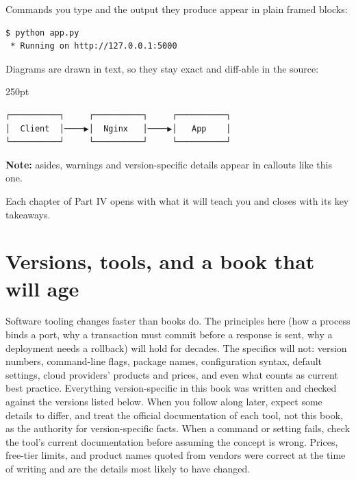 Commands you type and the output they produce appear in plain framed blocks:

\begin{outputbox}
\begin{Verbatim}[fontsize=\codesize]
$ python app.py
 * Running on http://127.0.0.1:5000
\end{Verbatim}
\end{outputbox}

Diagrams are drawn in text, so they stay exact and diff-able in the source:

\begin{diagrambox}{250pt}
\begin{Verbatim}[fontsize=\fontsize{9}{8.55}\selectfont]
┌──────────┐     ┌──────────┐     ┌──────────┐
│  Client  │────▶│  Nginx   │────▶│   App    │
└──────────┘     └──────────┘     └──────────┘
\end{Verbatim}
\end{diagrambox}

\begin{notebox}
\textbf{Note:} asides, warnings and version-specific details appear in callouts like this one.
\end{notebox}

Each chapter of Part IV opens with what it will teach you and closes with its key takeaways.

\section*{Versions, tools, and a book that will age}

Software tooling changes faster than books do. The principles here (how a process binds a port,
why a transaction must commit before a response is sent, why a deployment needs a rollback) will
hold for decades. The specifics will not: version numbers, command-line flags, package names,
configuration syntax, default settings, cloud providers' products and prices, and even what counts
as current best practice. Everything version-specific in this book was written and checked against
the versions listed below. When you follow along later, expect some details to differ, and treat
the official documentation of each tool, not this book, as the authority for version-specific
facts. When a command or setting fails, check the tool's current documentation before assuming the
concept is wrong. Prices, free-tier limits, and product names quoted from vendors were correct at
the time of writing and are the details most likely to have changed.


